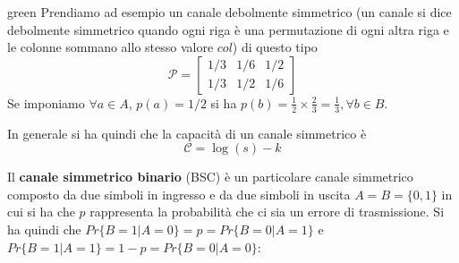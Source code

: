 \begin{mybox}[breakable]{green}{}
Prendiamo ad esempio un canale debolmente simmetrico (un canale si dice debolmente simmetrico quando ogni riga \`e una permutazione di ogni altra riga e le colonne sommano allo stesso valore $col$) di questo tipo
\begin{equation*}
    \mathcal{P} = \begin{bmatrix}
    1/3 & 1/6 & 1/2 \\
    1/3 & 1/2 & 1/6
    \end{bmatrix}
\end{equation*}
Se imponiamo $\forall a \in A$, $p(a) = 1/2$ si ha $p(b) = \frac{1}{2} \times \frac{2}{3} = \frac{1}{3}, \forall b \in B$.
\end{mybox}

In generale si ha quindi che la capacità di un canale simmetrico è
\begin{equation}
    \mathcal{C} = \log(s) - k
\end{equation}

Il \textbf{canale simmetrico binario} (BSC) è un particolare canale simmetrico composto da due simboli in ingresso e da due simboli in uscita $A = B = \{0,1\}$ in cui si ha che $p$ rappresenta la probabilità che ci sia un errore di trasmissione. Si ha quindi che $Pr\{B=1|A=0\} = p = Pr\{B=0|A=1\}$ e $Pr\{B=1|A=1\} = 1-p = Pr\{B=0|A=0\}$:

